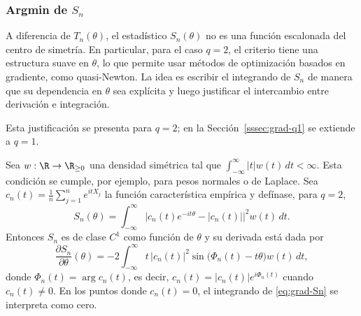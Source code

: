 \subsubsection{Argmin de $S_n$}

A diferencia de $T_n(\theta)$, el estadístico $S_n(\theta)$ no es una función escalonada del centro de simetría. En particular, para el caso $q=2$, el criterio tiene una estructura suave en $\theta$, lo que permite usar métodos de optimización basados en gradiente, como quasi-Newton. La idea es escribir el integrando de $S_n$ de manera que su dependencia en $\theta$ sea explícita y luego justificar el intercambio entre derivación e integración.

Esta justificación se presenta para $q=2$; en la Sección~\ref{sssec:grad-q1} se extiende a $q=1$.

\begin{proposicion}[Leibniz para $S_n$, $q=2$]\label{prop:leibniz-Sn}
Sea $w:\R\to\R_{\ge 0}$ una densidad simétrica tal que \(\int_{-\infty}^{\infty}|t|w(t)\,dt<\infty\).
Esta condición se cumple, por ejemplo, para pesos normales o de Laplace. Sea \(c_n(t)=\frac{1}{n}\sum_{j=1}^{n}e^{itX_j}\) la función característica empírica y defínase, para $q=2$,
\[
S_n(\theta)
=
\int_{-\infty}^{\infty}
\bigl|c_n(t)e^{-it\theta}-|c_n(t)|\bigr|^2w(t)\,dt.
\]
Entonces $S_n$ es de clase $C^1$ como función de $\theta$ y su derivada está dada por
\begin{equation}\label{eq:grad-Sn}
\frac{\partial S_n}{\partial \theta}(\theta)
=
-2\int_{-\infty}^{\infty}
t\,|c_n(t)|^2
\sin\!\bigl(\Phi_n(t)-t\theta\bigr)
w(t)\,dt,
\end{equation}
donde $\Phi_n(t)=\arg c_n(t)$, es decir, \(c_n(t)=|c_n(t)|e^{i\Phi_n(t)}\)
cuando $c_n(t)\neq 0$. En los puntos donde $c_n(t)=0$, el integrando de
\eqref{eq:grad-Sn} se interpreta como cero.
\end{proposicion}

